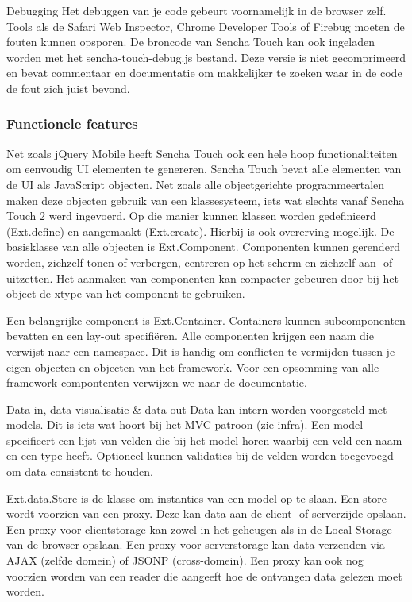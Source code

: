 Debugging
Het debuggen van je code gebeurt voornamelijk in de browser zelf.  Tools als de Safari Web Inspector,  Chrome Developer Tools of Firebug moeten de fouten kunnen opsporen.  De broncode van Sencha Touch kan ook ingeladen worden met het sencha-touch-debug.js bestand.  Deze versie is niet gecomprimeerd en bevat commentaar en documentatie om makkelijker te zoeken waar in de code de fout zich juist bevond.

\subsubsection{Functionele features}
Net zoals jQuery Mobile heeft Sencha Touch ook een hele hoop functionaliteiten om eenvoudig UI elementen te genereren.  Sencha Touch bevat alle elementen van de UI als JavaScript objecten.  Net zoals alle objectgerichte programmeertalen maken deze objecten gebruik van een klassesysteem,  iets wat slechts vanaf Sencha Touch 2 werd ingevoerd.  Op die manier kunnen klassen worden gedefinieerd (Ext.define) en aangemaakt (Ext.create).  Hierbij is ook overerving mogelijk.  De basisklasse van alle objecten is Ext.Component.  Componenten kunnen gerenderd worden, zichzelf tonen of verbergen,  centreren op het scherm en zichzelf aan- of uitzetten.   Het aanmaken van componenten kan compacter gebeuren door bij het object de xtype van het component te gebruiken.  

Een belangrijke component is Ext.Container.  Containers kunnen subcomponenten bevatten en een lay-out specifiëren.  Alle componenten krijgen een naam die verwijst naar een namespace.  Dit is handig om conflicten te vermijden tussen je eigen objecten en objecten van het framework.  Voor een opsomming van alle framework compontenten verwijzen we naar de documentatie.

Data in, data visualisatie \& data out
Data kan intern worden voorgesteld met models.  Dit is iets wat hoort bij het MVC patroon (zie infra).  Een model specifieert een lijst van velden die bij het model horen waarbij een veld een naam en een type heeft.  Optioneel kunnen validaties bij de velden worden toegevoegd om data consistent te houden.  

Ext.data.Store is de klasse om instanties van een model op te slaan.  Een store wordt voorzien van een proxy.  Deze kan data aan de client- of serverzijde opslaan.  Een proxy voor clientstorage kan zowel in het geheugen als in de Local Storage van de browser opslaan.  Een proxy voor serverstorage kan data verzenden via AJAX (zelfde domein) of JSONP (cross-domein).  Een proxy kan ook nog voorzien worden van een reader die aangeeft hoe de ontvangen data gelezen moet worden.

